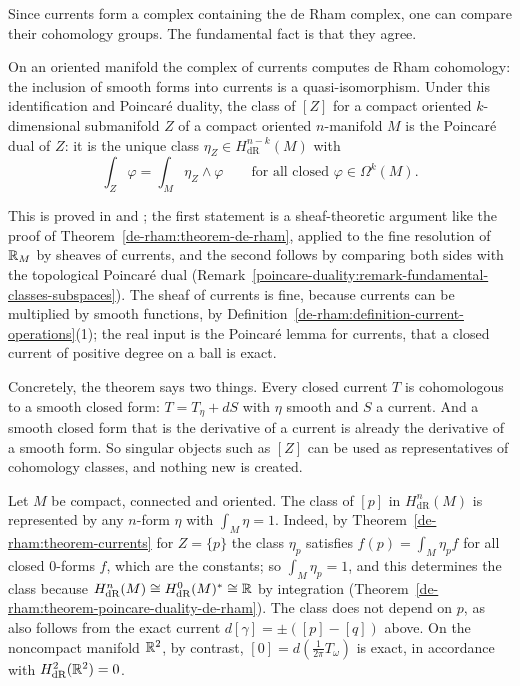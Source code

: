 Since currents form a complex containing the de Rham complex, one can compare their cohomology groups. The fundamental fact is that they agree.

\begin{theorem}\label{de-rham:theorem-currents}
On an oriented manifold the complex of currents computes de Rham cohomology: the inclusion of smooth forms into currents is a quasi-isomorphism. Under this identification and Poincar\'e duality, the class
of $[Z]$ for a compact oriented $k$-dimensional submanifold $Z$ of a compact oriented $n$-manifold $M$ is the Poincar\'e dual of $Z$: it is the unique class $\eta_Z \in H^{n-k}_{\mathrm{dR}}(M)$ with
\[
\int_Z\varphi = \int_M\eta_Z \wedge \varphi \qquad \text{for all closed } \varphi \in \Omega^k(M).
\]
\end{theorem}

This is proved in \cite[Chapter IV]{de-rham-book} and \cite[Chapter 0, Section 4]{griffiths-harris}; the first statement is a sheaf-theoretic argument like the proof of
Theorem~\ref{de-rham:theorem-de-rham}, applied to the fine resolution of $\mathbb{R}_M$ by sheaves of currents, and the second follows by comparing both sides with the topological Poincar\'e dual
(Remark~\ref{poincare-duality:remark-fundamental-classes-subspaces}). The sheaf of currents is fine, because currents can be multiplied by smooth functions, by
Definition~\ref{de-rham:definition-current-operations}(1); the real input is the Poincar\'e lemma for currents, that a closed current of positive degree on a ball is exact.

Concretely, the theorem says two things. Every closed current $T$ is cohomologous to a smooth closed form: $T = T_\eta + dS$ with $\eta$ smooth and $S$ a current. And a smooth closed form that is
the derivative of a current is already the derivative of a smooth form. So singular objects such as $[Z]$ can be used as representatives of cohomology classes, and nothing new is created.

\begin{example}\label{de-rham:example-point-class}
Let $M$ be compact, connected and oriented. The class of $[p]$ in $H^n_{\mathrm{dR}}(M)$ is represented by any $n$-form $\eta$ with $\int_M\eta = 1$. Indeed, by Theorem~\ref{de-rham:theorem-currents} for
$Z = \{p\}$ the class $\eta_p$ satisfies $f(p) = \int_M\eta_p f$ for all closed $0$-forms $f$, which are the constants; so $\int_M\eta_p = 1$, and this determines the class because
$H^n_{\mathrm{dR}}(M) \cong H^0_{\mathrm{dR}}(M)^* \cong \mathbb{R}$ by integration (Theorem~\ref{de-rham:theorem-poincare-duality-de-rham}). The class does not depend on $p$, as also follows from the exact
current $d[\gamma] = \pm([p] - [q])$ above. On the noncompact manifold $\mathbb{R}^2$, by contrast, $[0] = d(\frac{1}{2\pi}T_\omega)$ is exact, in accordance with $H^2_{\mathrm{dR}}(\mathbb{R}^2) = 0$.
\end{example}

